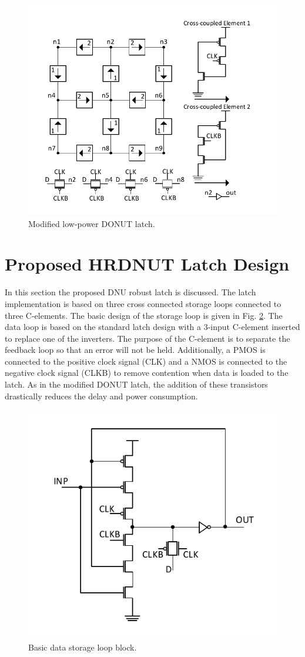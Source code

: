 \begin{figure}[htbp]
	\centering
	\includegraphics[width=0.65\linewidth]{Figures/ModDONUT}
	\caption{Modified low-power DONUT latch.}
	\label{DONUT_M}
\end{figure}

\section{Proposed HRDNUT Latch Design} \label{Proposed}
In this section the proposed DNU robust latch is discussed. The latch implementation is based on three cross connected storage loops connected to three C-elements. The basic design of the storage loop is given in Fig. \ref{Block}. The data loop is based on the standard latch design with a 3-input C-element inserted to replace one of the inverters. The purpose of the C-element is to separate the feedback loop so that an error will not be held. Additionally, a PMOS is connected to the positive clock signal (CLK) and a NMOS is connected to the negative clock signal (CLKB) to remove contention when data is loaded to the latch. As in the modified DONUT latch, the addition of these transistors drastically reduces the delay and power consumption.    

\begin{figure}[h]
	\centering
	\includegraphics[width=0.5\linewidth]{Figures/Block}
	\caption{Basic data storage loop block.}
	\label{Block}
\end{figure} 

